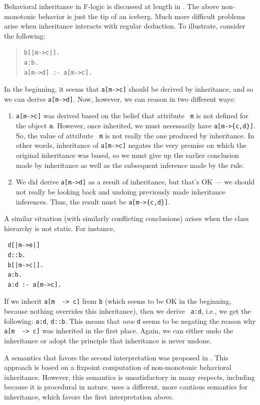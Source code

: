 \documentclass[11pt]{article}
\newcommand{\ERGO}{\mbox{\smaller{\ensuremath{\cal{E}}\smaller{{\sc{RGO}}}}}\xspace}
\newcommand{\FLSYSTEM}{\ERGO}
\newcommand{\mvd}{{\mbox{\tt \,->\,}}}  %
\newcommand{\fl}{\mbox{F-logic}\xspace}
\begin{document}
Behavioral inheritance in \fl is discussed at length in
\cite{inheritance-odbase-02,kifer-yang-inheritance-2006}.  The above  non-monotonic behavior is
just the tip of an iceberg. Much more difficult problems arise when
inheritance interacts with regular deduction. To illustrate, consider
the following:
\begin{quote}
\begin{verbatim}
b[|m->c|].
a:b.
a[m->d] :- a[m->c].
\end{verbatim}
\end{quote}
In the beginning, it seems that \verb|a[m->c]| should be derived by
inheritance, and so we can derive \verb|a[m->d]|. Now, however, we can
reason in two different ways:
\begin{enumerate}
\item \verb|a[m->c]| was derived based on the belief that attribute {\tt
    m} is not defined for the object {\tt a}. However, once inherited, we
  must necessarily have \verb|a[m->{c,d}]|. So, the value of attribute {\tt
    m} is not really the one produced by inheritance. In other words,
  inheritance of \verb|a[m->c]| negates the very premise on which the
  original inheritance was based, so we must give up the earlier conclusion
  made by inheritance as well as the subsequent inference made by the rule.
\item We did derive \verb|a[m->d]| as a result of inheritance, but
  that's OK --- we should not really be looking back and undoing previously
  made inheritance inferences. Thus, the result must be \verb|a[m->{c,d}]|.
\end{enumerate}
A similar situation (with similarly conflicting conclusions) arises when
the class hierarchy is not static. For instance, 
\begin{verbatim}
 d[|m->e|]
 d::b.
 b[|m->c|].
 a:b.
 a:d :- a[m->c].  
\end{verbatim}
If we inherit {\tt a[m \mvd c]}  from {\tt b} (which seems to be OK in the
beginning, because nothing overrides this inheritance), then we derive {\tt
  a:d}, i.e., we get the following: {\tt a:d}, {\tt d::b}. This means that
\emph{now} {\tt d} seems to be negating the reason why {\tt a[m \mvd c]} was
inherited in the first place. Again, we can either undo the inheritance or
adopt the principle that inheritance is never undone.

A semantics that favors the second interpretation was proposed in
\cite{KLW95}. This approach is based on a fixpoint computation of
non-monotonic behavioral inheritance.  However, this semantics is 
unsatisfactory in many
respects, including because it is procedural in
nature. \FLSYSTEM uses a
different, more cautious semantics for inheritance, which favors the first
interpretation above.
\end{document}
